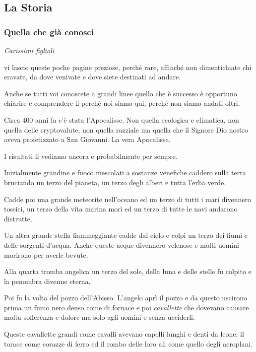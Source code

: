 \documentclass[12pt,a4paper,twoside,openany]{book}
\begin{document}
\subsection{La Storia}

\begin{multicols}{2}
	
\subsubsection{Quella che già conosci}

\textit{Carissimi figlioli}

vi lascio queste poche pagine preziose, perché rare, affinché non dimentichiate chi eravate, da dove venivate e dove siete destinati ad andare.

Anche se tutti voi conoscete a grandi linee quello che è successo è opportuno chiarire e comprendere il perché noi siamo qui, perché non siamo andati oltri.

Circa 400 anni fa c'è stata l'Apocalisse. Non quella ecologica e climatica, non quella delle cryptovalute, non quella razziale ma quella che il Signore Dio nostro aveva profetizzato a San Giovanni. La vera Apocalisse.

I risultati li vediamo ancora e probabilmente per sempre.

Inizialmente grandine e fuoco mescolati a sostanze venefiche caddero sulla terra bruciando un terzo del pianeta, un terzo degli alberi e tutta l'erba verde.

Cadde poi una grande meteorite nell'oceano ed un terzo di tutti i mari divennero tossici, un terzo della vita marina morì ed un terzo di tutte le navi andarono distrutte.

Un altra grande stella fiammeggiante cadde dal cielo e colpì un terzo dei fiumi e delle sorgenti d'acqua. Anche queste acque divennero velenose e molti uomini morirono per averle bevute.

Alla quarta tromba angelica un terzo del sole, della luna e delle stelle fu colpito e la penombra divenne eterna.

Poi fu la volta del pozzo dell'Abisso. L'angelo aprì il pozzo e da questo uscirono prima un fumo nero denso come di fornace e poi \textit{cavallette} che dovevano causare molta sofferenza e dolore ma solo agli uomini e senza ucciderli.

Queste cavallette grandi come cavalli avevano capelli lunghi e denti da leone, il torace come corazze di ferro ed il rombo delle loro ali come quello degli aeroplani.


\end{multicols}
\end{document}
